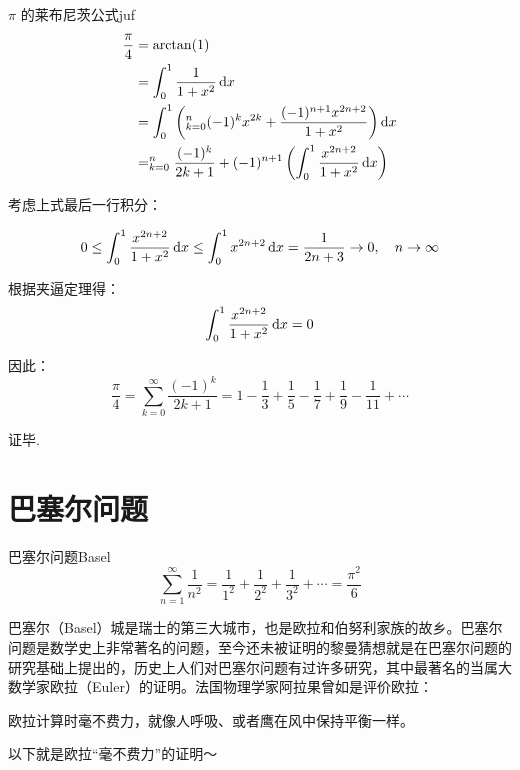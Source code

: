 \documentclass[12pt, cn]{elegantart}
\begin{document}
\begin{definition}{$\pi$ 的莱布尼茨公式}{juf}
	\begin{align*} \frac{\pi}{4} &=\arctan (1) \\ &=\int_{0}^{1} \frac{1}{1+x^{2}} \mathop{}\!\mathrm{d} x \\ &=\int_{0}^{1}\left(\relax_{k=0}^{n}(-1)^{k} x^{2 k}+\frac{(-1)^{n+1} x^{2 n+2}}{1+x^{2}}\right) \mathop{}\!\mathrm{d} x \\ &=\relax_{k=0}^{n} \frac{(-1)^{k}}{2 k+1}+(-1)^{n+1}\left(\int_{0}^{1} \frac{x^{2 n+2}}{1+x^{2}} \mathop{}\!\mathrm{d} x\right)
	\end{align*}
	
	考虑上式最后一行积分：
	
	$$ 0 \leq \int_{0}^{1} \frac{x^{2 n+2}}{1+x^{2}} \mathop{}\!\mathrm{d} x \leq \int_{0}^{1} x^{2 n+2} \mathop{}\!\mathrm{d} x=\frac{1}{2 n+3} \rightarrow 0, \quad n \rightarrow \infty $$
	
	根据夹逼定理得：
	$$ \int_{0}^{1} \frac{x^{2 n+2}}{1+x^{2}} \mathop{}\!\mathrm{d} x = 0 $$
	
	因此：
	$$
\frac{\pi}{4}=\sum_{k=0}^{\infty} \frac{(-1)^{k}}{2 k+1}=1-\frac{1}{3}+\frac{1}{5}-\frac{1}{7}+\frac{1}{9}-\frac{1}{11}+\cdots
$$
	
证毕.
\end{definition}


\section{巴塞尔问题}

\begin{theorem}{巴塞尔问题}{Basel}
	\begin{equation}
		\sum_{n=1}^{\infty} \frac{1}{n^{2}}=\frac{1}{1^{2}}+\frac{1}{2^{2}}+\frac{1}{3^{2}}+\cdots=\frac{\pi^2}{6}
	\end{equation}
\end{theorem}

巴塞尔（Basel）城是瑞士的第三大城市，也是欧拉和伯努利家族的故乡。巴塞尔问题是数学史上非常著名的问题，至今还未被证明的黎曼猜想就是在巴塞尔问题的研究基础上提出的，历史上人们对巴塞尔问题有过许多研究，其中最著名的当属大数学家欧拉（Euler）的证明。法国物理学家阿拉果曾如是评价欧拉：
\vspace{8pt}

\begin{tcolorbox}[saying]
欧拉计算时毫不费力，就像人呼吸、或者鹰在风中保持平衡一样。
\end{tcolorbox}

以下就是欧拉“毫不费力”的证明～
\end{document}
